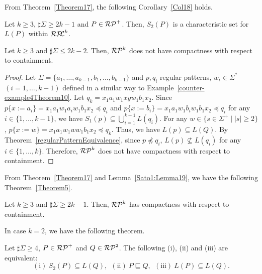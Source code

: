 From Theorem~\ref{Theorem17}, 
the following Corollary~\ref{Col18} holds.


\begin{col}\label{Col18}
    Let $k \geq 3$, $\sharp\Sigma \geq 2k-1$ and $P \in \mathcal{RP}^{+}$.
    Then, $S_{2}(P)$ is a characteristic set for $L(P)$ within $\mathcal{RP\!\!L}^{k}$.
\end{col}


\begin{lem}\label{Sato1:Lemma19}%
    Let $k \geq 3$ and $\sharp\Sigma \leq 2k-2$.
    Then, $\mathcal{RP}^{k}$ does not have compactness with respect to containment.
\end{lem}

\begin{proof}
    Let $\Sigma =\{a_{1},\ldots,a_{k-1},b_{1},\ldots,b_{k-1}\}$ and
    $p, q_{i}$ regular patterns, $w_{i} \in \Sigma^{\ast}$\ $(i=1,\ldots,k-1)$
    defined in a similar way to Example~\ref{counter-example4Theorem10}. %
    Let $q_{k}=x_{1}a_{1}w_{1}xyw_{1}b_{1}x_{2}$.
    Since
    $p\{x:=a_{i}\} = x_{1}a_{1}w_{1}a_{i}w_{1}b_{1}x_{2} \preceq q_{i}$ and
    $p\{x:=b_{i}\} = x_{1}a_{1}w_{1}b_{i}w_{1}b_{1}x_{2} \preceq q_{i}$
    for any $i \in \{1,\ldots,k-1\}$,
    we have $S_{1}(p) \subseteq \bigcup_{i=1}^{k-1}L(q_{i})$.
    For any $w \in \{s \in \Sigma^{+} \mid |s| \geq 2\}$,
    $p\{x:=w\}=x_{1}a_{1}w_{1}ww_{1}b_{1}x_{2} \preceq q_{k}$.
    Thus, we have $L(p) \subseteq L(Q)$.
    By Theorem~\ref{regularPatternEquivalence},
    since $p \not \preceq q_{i}$, $L(p) \not \subseteq L(q_{i})$
    for any $i \in \{1,\ldots, k\}$.
    Therefore, $\mathcal{RP}^{k}$ does not have compactness with respect to containment.
\end{proof}

From Theorem~\ref{Theorem17} and Lemma~\ref{Sato1:Lemma19}, 
we have the following Theorem~\ref{Theorem5}.

\begin{thm}\label{Theorem5}
    Let $k \geq 3$ and $\sharp\Sigma \geq 2k-1$.
    Then, $\mathcal{RP}^{k}$ has compactness with respect to containment.
\end{thm}

In case $k=2$, we have the following theorem.

\begin{thm}\label{Theorem21}
    Let $\sharp\Sigma \geq 4$, $P \in \mathcal{RP}^{+}$ and $Q \in \mathcal{RP}^{2}$.
    The following (i), (ii) and (iii) are equivalent:
    \[
        \mathrm{(i)}\ S_{2}(P) \subseteq L(Q),\ \
        \mathrm{(ii)}\ P \sqsubseteq Q, \ \
        \mathrm{(iii)}\ L(P) \subseteq L(Q).
    \]
\end{thm}


